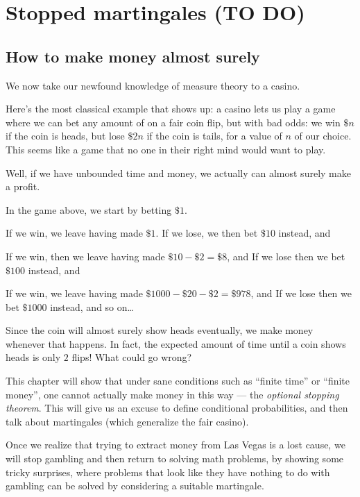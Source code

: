 \chapter{Stopped martingales (TO DO)}
\label{ch:martingales}
\section{How to make money almost surely}
We now take our newfound knowledge of measure theory to a casino.

Here's the most classical example that shows up:
a casino lets us play a game where we can bet any amount of
on a fair coin flip, but with bad odds:
we win $\$n$ if the coin is heads,
but lose $\$2n$ if the coin is tails,
for a value of $n$ of our choice.
This seems like a game that no one in their right mind would want to play.

Well, if we have unbounded time and money,
we actually can almost surely make a profit.
\begin{example}
	In the game above, we start by betting $\$1$.
	\begin{itemize}
		\ii If we win, we leave having made $\$1$.
		\ii If we lose, we then bet $\$10$ instead, and
		\begin{itemize}
			\ii If we win, then we leave having made $\$10-\$2=\$8$, and
			\ii If we lose then we bet $\$100$ instead, and
			\begin{itemize}
				\ii If we win, we leave having made $\$1000-\$20-\$2=\$978$, and
				\ii If we lose then we bet $\$1000$ instead, and so on\dots
			\end{itemize}
		\end{itemize}
	\end{itemize}
	Since the coin will almost surely show heads eventually,
	we make money whenever that happens.
	In fact, the expected amount of time until a coin shows heads
	is only $2$ flips! What could go wrong?
\end{example}
This chapter will show that under sane conditions
such as ``finite time'' or ``finite money'',
one cannot actually make money in this way --- the \emph{optional stopping theorem}.
This will give us an excuse to define conditional probabilities,
and then talk about martingales (which generalize the fair casino).

Once we realize that trying to extract money from Las Vegas is a lost cause,
we will stop gambling and then return to solving math problems,
by showing some tricky surprises,
where problems that look like they have nothing to do with gambling
can be solved by considering a suitable martingale.

